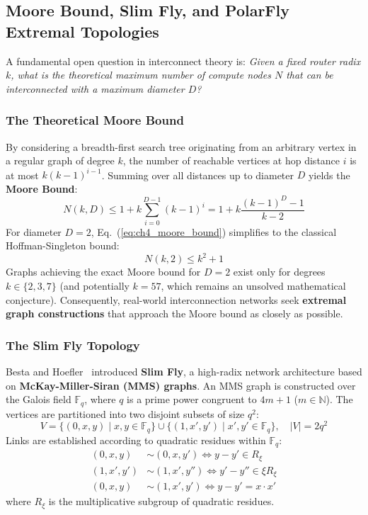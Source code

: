 \subsection{Moore Bound, Slim Fly, and PolarFly Extremal Topologies}
\label{subsec:ch4_extremal}

A fundamental open question in interconnect theory is: \emph{Given a fixed router radix $k$, what is the theoretical maximum number of compute nodes $N$ that can be interconnected with a maximum diameter $D$?}

\subsubsection{The Theoretical Moore Bound}
By considering a breadth-first search tree originating from an arbitrary vertex in a regular graph of degree $k$, the number of reachable vertices at hop distance $i$ is at most $k(k - 1)^{i-1}$. Summing over all distances up to diameter $D$ yields the \textbf{Moore Bound}:
\begin{equation}
N(k, D) \le 1 + k \sum_{i=0}^{D-1} (k - 1)^i = 1 + k \frac{(k - 1)^D - 1}{k - 2}
\label{eq:ch4_moore_bound}
\end{equation}
For diameter $D = 2$, Eq.~(\ref{eq:ch4_moore_bound}) simplifies to the classical Hoffman-Singleton bound:
\begin{equation}
N(k, 2) \le k^2 + 1
\label{eq:ch4_moore_d2}
\end{equation}
Graphs achieving the exact Moore bound for $D=2$ exist only for degrees $k \in \{2, 3, 7\}$ (and potentially $k = 57$, which remains an unsolved mathematical conjecture). Consequently, real-world interconnection networks seek \textbf{extremal graph constructions} that approach the Moore bound as closely as possible.

\subsubsection{The Slim Fly Topology}
Besta and Hoefler~\cite{Besta2014} introduced \textbf{Slim Fly}, a high-radix network architecture based on \textbf{McKay-Miller-Siran (MMS) graphs}. An MMS graph is constructed over the Galois field $\mathbb{F}_q$, where $q$ is a prime power congruent to $4m + 1$ ($m \in \mathbb{N}$). The vertices are partitioned into two disjoint subsets of size $q^2$:
\begin{equation}
V = \{ (0, x, y) \mid x, y \in \mathbb{F}_q \} \cup \{ (1, x', y') \mid x', y' \in \mathbb{F}_q \}, \quad |V| = 2q^2
\label{eq:ch4_mms_vertices}
\end{equation}
Links are established according to quadratic residues within $\mathbb{F}_q$:
\begin{align}
(0, x, y) &\sim (0, x, y') \iff y - y' \in R_{\xi} \\
(1, x', y') &\sim (1, x', y'') \iff y' - y'' \in \xi R_{\xi} \\
(0, x, y) &\sim (1, x', y') \iff y - y' = x \cdot x'
\end{align}
where $R_{\xi}$ is the multiplicative subgroup of quadratic residues.

